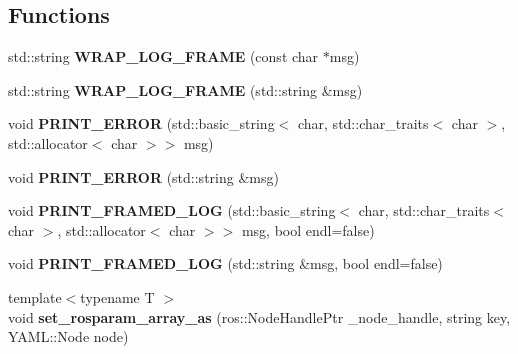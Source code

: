 \subsection*{Functions}
\begin{DoxyCompactItemize}
\item 
\mbox{\label{namespace_r_n_b_a9853c3c68449a2b06eb815a69b9efc9b}} 
std\+::string {\bfseries W\+R\+A\+P\+\_\+\+L\+O\+G\+\_\+\+F\+R\+A\+ME} (const char $\ast$msg)
\item 
\mbox{\label{namespace_r_n_b_a685a5b215d9f97bdbfe0665e1f837386}} 
std\+::string {\bfseries W\+R\+A\+P\+\_\+\+L\+O\+G\+\_\+\+F\+R\+A\+ME} (std\+::string \&msg)
\item 
\mbox{\label{namespace_r_n_b_a18695a1aae5fe41ba87ecc3da799b8ea}} 
void {\bfseries P\+R\+I\+N\+T\+\_\+\+E\+R\+R\+OR} (std\+::basic\+\_\+string$<$ char, std\+::char\+\_\+traits$<$ char $>$, std\+::allocator$<$ char $>$$>$ msg)
\item 
\mbox{\label{namespace_r_n_b_a4eed88102d13a4474d72194c0bfd2ff7}} 
void {\bfseries P\+R\+I\+N\+T\+\_\+\+E\+R\+R\+OR} (std\+::string \&msg)
\item 
\mbox{\label{namespace_r_n_b_a15b04b282208370d31bd659ef2fb5549}} 
void {\bfseries P\+R\+I\+N\+T\+\_\+\+F\+R\+A\+M\+E\+D\+\_\+\+L\+OG} (std\+::basic\+\_\+string$<$ char, std\+::char\+\_\+traits$<$ char $>$, std\+::allocator$<$ char $>$$>$ msg, bool endl=false)
\item 
\mbox{\label{namespace_r_n_b_add870feb0559ad0437bfa1b76fd9f9f7}} 
void {\bfseries P\+R\+I\+N\+T\+\_\+\+F\+R\+A\+M\+E\+D\+\_\+\+L\+OG} (std\+::string \&msg, bool endl=false)
\item 
\mbox{\label{namespace_r_n_b_a37f46872318ea10fa607d8aceb88dc5b}} 
{\footnotesize template$<$typename T $>$ }\\void {\bfseries set\+\_\+rosparam\+\_\+array\+\_\+as} (ros\+::\+Node\+Handle\+Ptr \+\_\+node\+\_\+handle, string key, Y\+A\+M\+L\+::\+Node node)
\item 
\mbox{\label{namespace_r_n_b_adc43283bd34ca2c054254b0a6121f7b1}} 

\end{DoxyCompactItemize}
